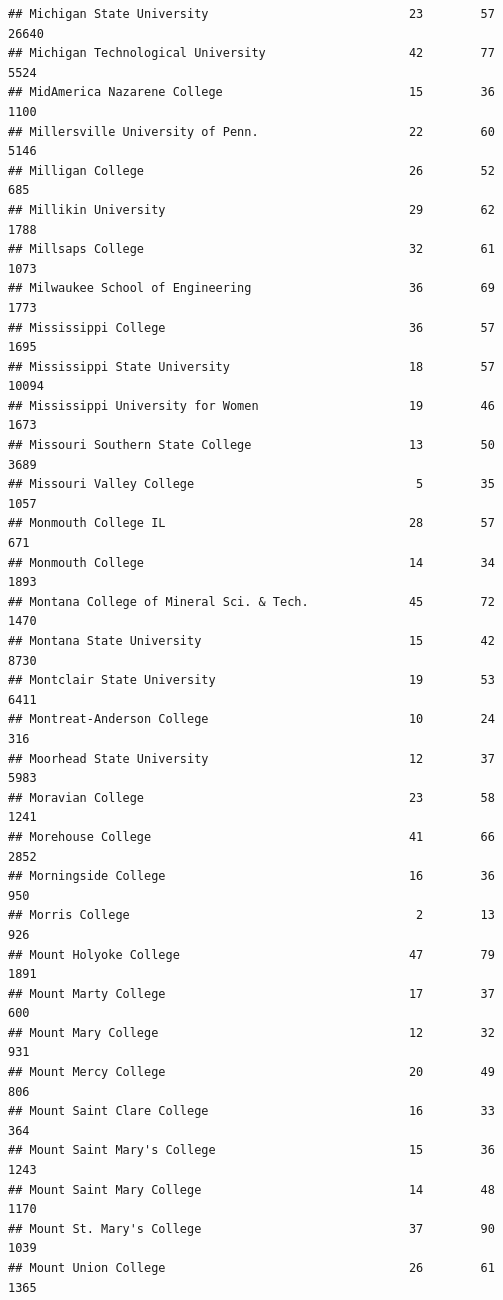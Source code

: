 \documentclass[
]{article}
\begin{document}
\begin{verbatim}
## Michigan State University                            23        57       26640
## Michigan Technological University                    42        77        5524
## MidAmerica Nazarene College                          15        36        1100
## Millersville University of Penn.                     22        60        5146
## Milligan College                                     26        52         685
## Millikin University                                  29        62        1788
## Millsaps College                                     32        61        1073
## Milwaukee School of Engineering                      36        69        1773
## Mississippi College                                  36        57        1695
## Mississippi State University                         18        57       10094
## Mississippi University for Women                     19        46        1673
## Missouri Southern State College                      13        50        3689
## Missouri Valley College                               5        35        1057
## Monmouth College IL                                  28        57         671
## Monmouth College                                     14        34        1893
## Montana College of Mineral Sci. & Tech.              45        72        1470
## Montana State University                             15        42        8730
## Montclair State University                           19        53        6411
## Montreat-Anderson College                            10        24         316
## Moorhead State University                            12        37        5983
## Moravian College                                     23        58        1241
## Morehouse College                                    41        66        2852
## Morningside College                                  16        36         950
## Morris College                                        2        13         926
## Mount Holyoke College                                47        79        1891
## Mount Marty College                                  17        37         600
## Mount Mary College                                   12        32         931
## Mount Mercy College                                  20        49         806
## Mount Saint Clare College                            16        33         364
## Mount Saint Mary's College                           15        36        1243
## Mount Saint Mary College                             14        48        1170
## Mount St. Mary's College                             37        90        1039
## Mount Union College                                  26        61        1365

\end{verbatim}
\end{document}
